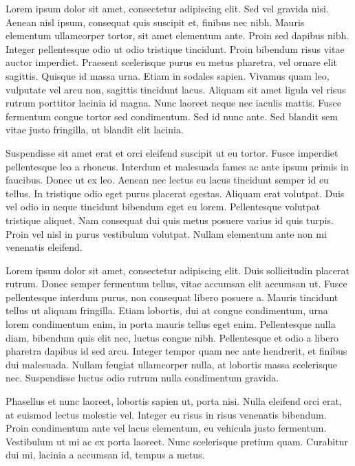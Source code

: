 Lorem ipsum dolor sit amet, consectetur adipiscing elit. Sed vel gravida nisi. Aenean nisl ipsum, consequat quis suscipit et, finibus nec nibh. Mauris elementum ullamcorper tortor, sit amet elementum ante. Proin sed dapibus nibh. Integer pellentesque odio ut odio tristique tincidunt. Proin bibendum risus vitae auctor imperdiet. Praesent scelerisque purus eu metus pharetra, vel ornare elit sagittis. Quisque id massa urna. Etiam in sodales sapien. Vivamus quam leo, vulputate vel arcu non, sagittis tincidunt lacus. Aliquam sit amet ligula vel risus rutrum porttitor lacinia id magna. Nunc laoreet neque nec iaculis mattis. Fusce fermentum congue tortor sed condimentum. Sed id nunc ante. Sed blandit sem vitae justo fringilla, ut blandit elit lacinia.

Suspendisse sit amet erat et orci eleifend suscipit ut eu tortor. Fusce imperdiet pellentesque leo a rhoncus. Interdum et malesuada fames ac ante ipsum primis in faucibus. Donec ut ex leo. Aenean nec lectus eu lacus tincidunt semper id eu tellus. In tristique odio eget purus placerat egestas. Aliquam erat volutpat. Duis vel odio in neque tincidunt bibendum eget eu lorem. Pellentesque volutpat tristique aliquet. Nam consequat dui quis metus posuere varius id quis turpis. Proin vel nisl in purus vestibulum volutpat. Nullam elementum ante non mi venenatis eleifend.

Lorem ipsum dolor sit amet, consectetur adipiscing elit. Duis sollicitudin placerat rutrum. Donec semper fermentum tellus, vitae accumsan elit accumsan ut. Fusce pellentesque interdum purus, non consequat libero posuere a. Mauris tincidunt tellus ut aliquam fringilla. Etiam lobortis, dui at congue condimentum, urna lorem condimentum enim, in porta mauris tellus eget enim. Pellentesque nulla diam, bibendum quis elit nec, luctus congue nibh. Pellentesque et odio a libero pharetra dapibus id sed arcu. Integer tempor quam nec ante hendrerit, et finibus dui malesuada. Nullam feugiat ullamcorper nulla, at lobortis massa scelerisque nec. Suspendisse luctus odio rutrum nulla condimentum gravida.

Phasellus et nunc laoreet, lobortis sapien ut, porta nisi. Nulla eleifend orci erat, at euismod lectus molestie vel. Integer eu risus in risus venenatis bibendum. Proin condimentum ante vel lacus elementum, eu vehicula justo fermentum. Vestibulum ut mi ac ex porta laoreet. Nunc scelerisque pretium quam. Curabitur dui mi, lacinia a accumsan id, tempus a metus.